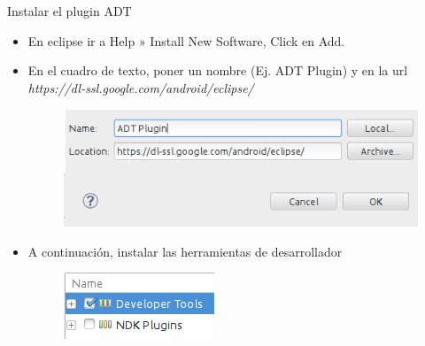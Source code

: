 \begin{frame}{Instalar el plugin ADT}{}
  \begin{itemize}
  \item {
    En eclipse ir a Help » Install New Software, Click en Add.
  }
  \item {
    En el cuadro de texto, poner un nombre (Ej. ADT Plugin) y en la url \textit{https://dl-ssl.google.com/android/eclipse/}
  }

    \begin{figure}[h]
        \centering
        \includegraphics[scale=.5]{./img/adt.png}
    \end{figure}

    \item{A continuación, instalar las herramientas de desarrollador}

    \begin{figure}[H]
    \centering
    \includegraphics[scale=.4]{./img/dt.png}
    \end{figure}

  \end{itemize}
\end{frame}


